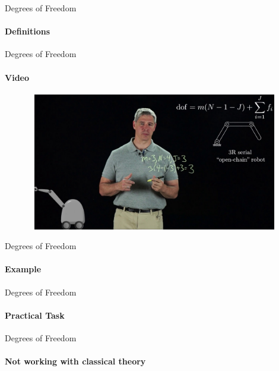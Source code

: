 \documentclass[aspectratio=169]{beamer}
\begin{document}
\begin{frame}[t]{Degrees of Freedom}
    \framesubtitle{Definitions}
        
    \end{frame}


\begin{frame}[t]{Degrees of Freedom}
    \framesubtitle{Video}
    \vspace{-0.6cm}
    \begin{figure}[H]
        \href{https://youtu.be/zI64DyaRUvQ}{
            \centering\includegraphics[height=6cm,width=1\textwidth,keepaspectratio]{dof_video.jpg}}
        \label{fig:dof_video.jpg}
    \end{figure}
\end{frame}

\begin{frame}[t]{Degrees of Freedom}
    \framesubtitle{Example}
        
    \end{frame}

\begin{frame}[t]{Degrees of Freedom}
    \framesubtitle{Practical Task}
        
    \end{frame}
    
\begin{frame}[t]{Degrees of Freedom}
    \framesubtitle{Not working with classical theory}
        
    \end{frame}
\end{document}
